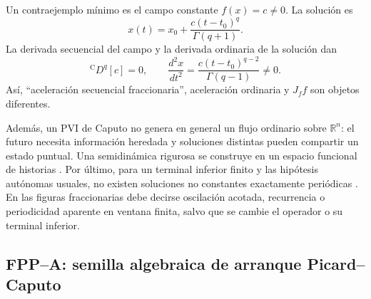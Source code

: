 Un contraejemplo mínimo es el campo constante \(f(x)=c\neq0\). La solución es
\begin{equation}
 x(t)=x_0+\frac{c(t-t_0)^q}{\Gamma(q+1)}.
 \label{eq:pp-constant-field-solution}
\end{equation}
La derivada secuencial del campo y la derivada ordinaria de la solución dan
\begin{equation}
 {}^{\mathrm C}D^q[c]=0,
 \qquad
 \frac{d^2x}{dt^2}
 =\frac{c(t-t_0)^{q-2}}{\Gamma(q-1)}\neq0.
 \label{eq:pp-constant-field-counterexample}
\end{equation}
Así, ``aceleración secuencial fraccionaria'', aceleración ordinaria y
\(J_f f\) son objetos diferentes.

Además, un PVI de Caputo no genera en general un flujo ordinario sobre
\(\mathbb R^n\): el futuro necesita información heredada y soluciones
distintas pueden compartir un estado puntual. Una semidinámica rigurosa se
construye en un espacio funcional de historias
\cite{CongTuan2017Nonlocal,DoanKloeden2021Semidynamical}. Por último, para un
terminal inferior finito y las hipótesis autónomas usuales, no existen
soluciones no constantes exactamente periódicas
\cite{TavazoeiHaeri2009,KaslikSivasundaram2012}. En las figuras fraccionarias
debe decirse oscilación acotada, recurrencia o periodicidad aparente en ventana
finita, salvo que se cambie el operador o su terminal inferior.

\subsection{FPP--A: semilla algebraica de arranque Picard--Caputo}

